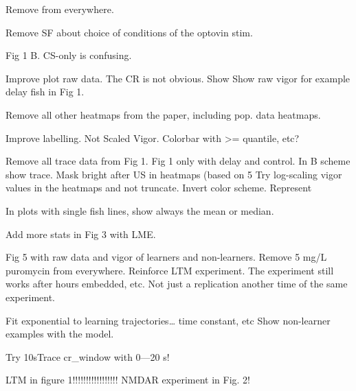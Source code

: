 Remove from everywhere.






Remove SF about choice of conditions of the optovin stim.

Fig 1
B. CS-only is confusing.

Improve plot raw data. The CR is not obvious.
Show %
Show raw vigor for example delay fish in Fig 1.

Remove all other heatmaps from the paper, including pop. data heatmaps.

Improve labelling. Not Scaled Vigor. Colorbar with >= quantile, etc?

Remove all trace data from Fig 1. Fig 1 only with delay and control. In B scheme show trace.
Mask bright after US in heatmaps (based on 5%
Try log-scaling vigor values in the heatmaps and not truncate.
Invert color scheme.
Represent %

In plots with single fish lines, show always the mean or median.

Add more stats in Fig 3 with LME.

Fig 5 with raw data and vigor of learners and non-learners.
Remove 5 mg/L puromycin from everywhere.
Reinforce LTM experiment. The experiment still works after hours embedded, etc. Not just a replication another time of the same experiment.

Fit exponential to learning trajectories… time constant, etc
Show non-learner examples with the model.

Try 10sTrace cr_window with 0—20 s!

LTM in figure 1!!!!!!!!!!!!!!!!!
NMDAR experiment in Fig. 2!